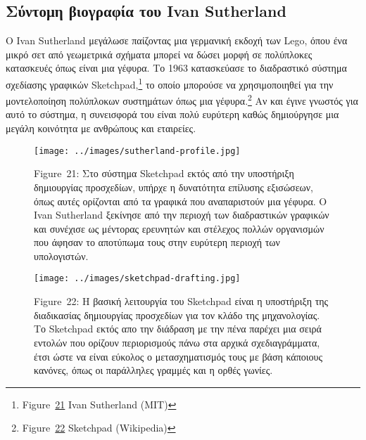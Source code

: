 \documentclass[
]{article}
\begin{document}
\hypertarget{ux3c3ux3cdux3bdux3c4ux3bfux3bcux3b7-ux3b2ux3b9ux3bfux3b3ux3c1ux3b1ux3c6ux3afux3b1-ux3c4ux3bfux3c5-ivan-sutherland}{%
\subsection{Σύντομη βιογραφία του Ivan
Sutherland}\label{ux3c3ux3cdux3bdux3c4ux3bfux3bcux3b7-ux3b2ux3b9ux3bfux3b3ux3c1ux3b1ux3c6ux3afux3b1-ux3c4ux3bfux3c5-ivan-sutherland}}

Ο Ivan Sutherland μεγάλωσε παίζοντας μια γερμανική εκδοχή των Lego, όπου
ένα μικρό σετ από γεωμετρικά σχήματα μπορεί να δώσει μορφή σε πολύπλοκες
κατασκευές όπως είναι μια γέφυρα. Το 1963 κατασκεύασε το διαδραστικό
σύστημα σχεδίασης γραφικών Sketchpad,\footnote{Figure~\protect\hyperlink{fig:sutherland-profile}{21}
  Ivan Sutherland (MIT)} το οποίο μπορούσε να χρησιμοποιηθεί για την
μοντελοποίηση πολύπλοκων συστημάτων όπως μια γέφυρα.\footnote{Figure~\protect\hyperlink{fig:sketchpad-drafting}{22}
  Sketchpad (Wikipedia)} Αν και έγινε γνωστός για αυτό το σύστημα, η
συνεισφορά του είναι πολύ ευρύτερη καθώς δημιούργησε μια μεγάλη
κοινότητα με ανθρώπους και εταιρείες.

\leavevmode{}%
\begin{figure}
\hypertarget{fig:sutherland-profile}{%
\centering
\texttt{[image: ../images/sutherland-profile.jpg]}
\caption{Figure~21: Στο σύστημα Sketchpad εκτός από την υποστήριξη
δημιουργίας προσχεδίων, υπήρχε η δυνατότητα επίλυσης εξισώσεων, όπως
αυτές ορίζονται από τα γραφικά που αναπαριστούν μια γέφυρα. O Ivan
Sutherland ξεκίνησε από την περιοχή των διαδραστικών γραφικών και
συνέχισε ως μέντορας ερευνητών και στέλεχος πολλών οργανισμών που άφησαν
το αποτύπωμα τους στην ευρύτερη περιοχή των
υπολογιστών.}\label{fig:sutherland-profile}
}
\end{figure}

\leavevmode{}%
\begin{figure}
\hypertarget{fig:sketchpad-drafting}{%
\centering
\texttt{[image: ../images/sketchpad-drafting.jpg]}
\caption{Figure~22: Η βασική λειτουργία του Sketchpad είναι η υποστήριξη
της διαδικασίας δημιουργίας προσχεδίων για τον κλάδο της μηχανολογίας.
Το Sketchpad εκτός απο την διάδραση με την πένα παρέχει μια σειρά
εντολών που ορίζουν περιορισμούς πάνω στα αρχικά σχεδιαγράμματα, έτσι
ώστε να είναι εύκολος ο μετασχηματισμός τους με βάση κάποιους κανόνες,
όπως οι παράλληλες γραμμές και η ορθές
γωνίες.}\label{fig:sketchpad-drafting}
}
\end{figure}
\end{document}
